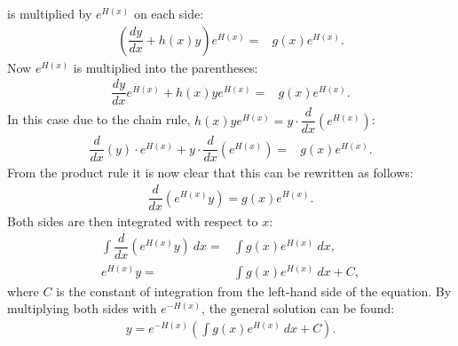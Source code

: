 \begin{prof}{}{}
 is multiplied by $e^{H(x)}$ on each side:
\begin{align*}
\left(\dfrac{dy}{dx}+h(x)y\right)e^{H(x)}=& g(x)e^{H(x)}.
\end{align*}
Now $e^{H(x)}$ is multiplied into the parentheses:
\begin{align*}
\dfrac{dy}{dx}e^{H(x)}+h(x)ye^{H(x)}=& g(x)e^{H(x)}.
\end{align*}
In this case due to the chain rule, $h(x)ye^{H(x)} = y \cdot \dfrac{d}{dx} \left(e^{H(x)} \right)$:
\begin{align*}
\dfrac{d}{dx} \left(y \right) \cdot e^{H(x)} + y \cdot \dfrac{d}{dx} \left(e^{H(x)} \right)=& g(x)e^{H(x)}.
\end{align*}
From the product rule it is now clear that this can be rewritten as follows:
\begin{align*}
\dfrac{d}{dx}\left(e^{H(x)}y\right)=g(x)e^{H(x)}.
\end{align*}
Both sides are then integrated with respect to $x$:
\begin{align*}
\int\dfrac{d}{dx}\left(e^{H(x)}y\right)\ dx=&\int g(x)e^{H(x)}\ dx,
\\
e^{H(x)}y=&\int g(x)e^{H(x)}\ dx+C,
\end{align*}
where $C$ is the constant of integration from the left-hand side of the  equation. By multiplying both sides with $e^{-H(x)}$, the general solution can be found:
\begin{align*}
y=e^{-H(x)}\left(\int g(x)e^{H(x)}\ dx+C\right).
\end{align*}
\end{prof}

